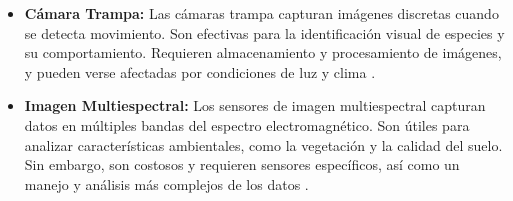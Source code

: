 \begin{itemize}
\item \textbf{Cámara Trampa:} Las cámaras trampa capturan imágenes discretas cuando se detecta movimiento. Son efectivas para la identificación visual de especies y su comportamiento. Requieren almacenamiento y procesamiento de imágenes, y pueden verse afectadas por condiciones de luz y clima \cite{82}.
\item \textbf{Imagen Multiespectral:} Los sensores de imagen multiespectral capturan datos en múltiples bandas del espectro electromagnético. Son útiles para analizar características ambientales, como la vegetación y la calidad del suelo. Sin embargo, son costosos y requieren sensores específicos, así como un manejo y análisis más complejos de los datos \cite{83}.
\end{itemize}

